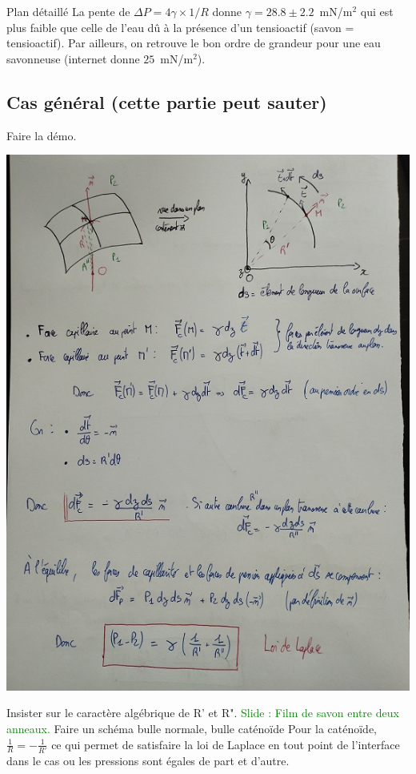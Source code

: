 \begin{reportBlock}{Plan détaillé}
La pente de $\Delta P = 4 \gamma\times 1/R$ donne $\gamma=28.8 \pm 2.2$~mN/m$^2$ qui est plus faible que celle de l'eau dû à la présence d'un tensioactif (savon = tensioactif). Par ailleurs, on retrouve le bon ordre de grandeur pour une eau savonneuse (internet donne $25$~mN/m$^2$). \\

\subsection{Cas général (cette partie peut sauter)}
Faire la démo. 
\begin{center}
    \includegraphics[scale=0.5]{LP_TensionSurface/Demo_Laplace.jpg}
\end{center}
Insister sur le caractère algébrique de R' et R". \textcolor{green}{Slide : Film de savon entre deux anneaux.}
Faire un schéma bulle normale, bulle caténoïde Pour la caténoïde, $\frac{1}{R}=-\frac{1}{R'}$ ce qui permet de satisfaire la loi de Laplace en tout point de l'interface dans le cas ou les pressions sont égales de part et d'autre.\\


\end{reportBlock}
